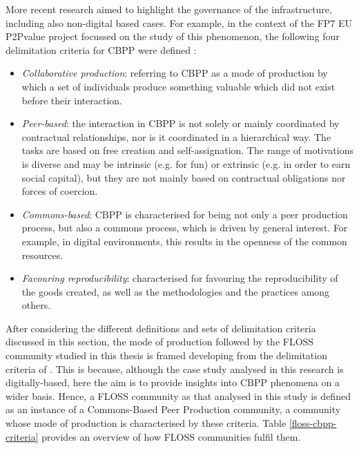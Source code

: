 More recent research aimed to highlight the governance of the infrastructure, including also non-digital based cases. For example, in the context of the FP7 EU P2Pvalue project focussed on the study of this phenomenon, the following four delimitation criteria for CBPP were defined \parencite[3]{morell2016mayo}:

\begin{itemize}
	\item \textit{Collaborative production}: referring to CBPP as a mode of production by which a set of individuals produce something valuable which did not exist before their interaction.
	\item\textit{Peer-based}: the interaction in CBPP is not solely or mainly coordinated by contractual relationships, nor is it coordinated in a hierarchical way. The tasks are based on free creation and self-assignation. The range of motivations is diverse and may be intrinsic (e.g. for fun) or extrinsic (e.g. in order to earn social capital), but they are not mainly based on contractual obligations nor forces of coercion.
	\item \textit{Commons-based}: CBPP is characterised for being not only a peer production process, but also a commons process, which is driven by general interest. For example, in digital environments,  this results in the openness of the common resources.
	\item \textit{Favouring reproducibility}: characterised for favouring the reproducibility of the goods created, as well as the methodologies and the practices among others.
\end{itemize}

After considering the different definitions and sets of delimitation criteria discussed in this section, the mode of production followed by the FLOSS community studied in this thesis is framed developing from the delimitation criteria of \textcite[3]{morell2016mayo}. This is because, although the case study analysed in this research is digitally-based, here the aim is to provide insights into CBPP phenomena on a wider basis. Hence, a FLOSS community as that analysed in this study is defined as an instance of a Commons-Based Peer Production community, a community whose mode of production is characterised by these criteria. Table \ref{floss-cbpp-criteria} provides an overview of how FLOSS communities fulfil them. 

